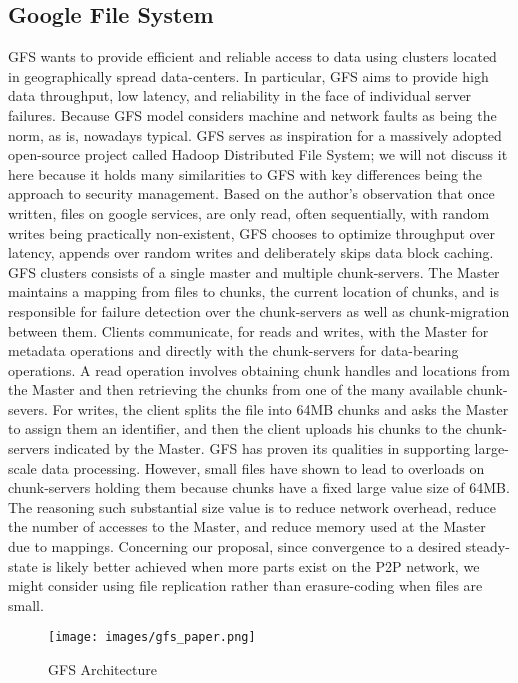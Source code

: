 \documentclass[runningheads]{llncs}
\begin{document}
\subsection{Google File System}
GFS wants to provide efficient and reliable access to data using clusters located in geographically spread data-centers. In particular, GFS aims to provide high data throughput, low latency, and reliability in the face of individual server failures. Because GFS model considers machine and network faults as being the norm, as is, nowadays typical. GFS serves as inspiration for a massively adopted open-source project called Hadoop Distributed File System\cite{hadoop}; we will not discuss it here because it holds many similarities to GFS with key differences being the approach to security management. Based on the author's observation that once written, files on google services, are only read, often sequentially, with random writes being practically non-existent, GFS chooses to optimize throughput over latency, appends over random writes and deliberately skips data block caching. GFS clusters consists of a single master and multiple chunk-servers. The Master maintains a mapping from files to chunks, the current location of chunks, and is responsible for failure detection over the chunk-servers as well as chunk-migration between them. Clients communicate, for reads and writes, with the Master for metadata operations and directly with the chunk-servers for data-bearing operations. A read operation involves obtaining chunk handles and locations from the Master and then retrieving the chunks from one of the many available chunk-severs. For writes, the client splits the file into 64MB chunks and asks the Master to assign them an identifier, and then the client uploads his chunks to the chunk-servers indicated by the Master. GFS has proven its qualities in supporting large-scale data processing. However, small files have shown to lead to overloads on chunk-servers holding them because chunks have a fixed large value size of 64MB. The reasoning such substantial size value is to reduce network overhead, reduce the number of accesses to the Master, and reduce memory used at the Master due to mappings. Concerning our proposal, since convergence to a desired steady-state is likely better achieved when more parts exist on the P2P network, we might consider using file replication rather than erasure-coding when files are small.

\begin{figure}[t]
\centering
\texttt{[image: images/gfs\_paper.png]}
\caption{GFS Architecture}
\label{fig:gfs_arch}
\end{figure}
\end{document}
